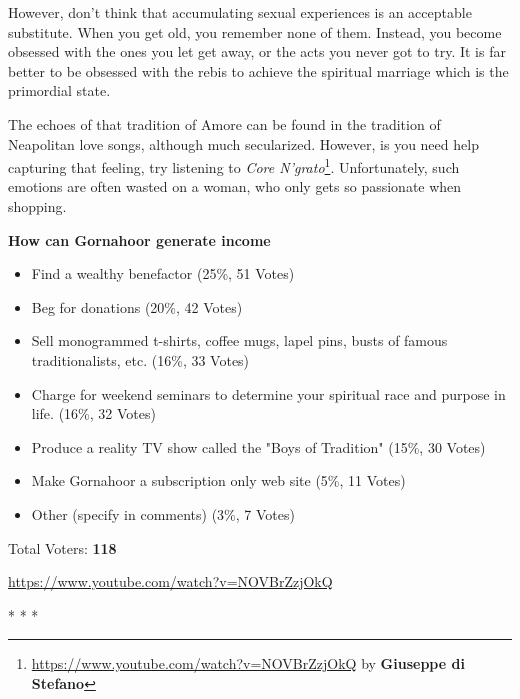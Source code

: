 However, don't think that accumulating sexual experiences is an acceptable substitute. When you get old, you remember none of them. Instead, you become obsessed with the ones you let get away, or the acts you never got to try. It is far better to be obsessed with the rebis to achieve the spiritual marriage which is the primordial state.

The echoes of that tradition of Amore can be found in the tradition of Neapolitan love songs, although much secularized. However, is you need help capturing that feeling, try listening to
\emph{Core N'grato}\footnote{\url{https://www.youtube.com/watch?v=NOVBrZzjOkQ} by \textbf{Giuseppe di Stefano}}. Unfortunately, such emotions are often wasted on a woman, who only gets so passionate when shopping.

\textbf{How can Gornahoor generate income}


\begin{itemize}


\item Find a wealthy benefactor {(25\%, 51 Votes)}

\item Beg for donations {(20\%, 42 Votes)}

\item Sell monogrammed t-shirts, coffee mugs, lapel pins, busts of famous traditionalists, etc. {(16\%, 33 Votes)}

\item Charge for weekend seminars to determine your spiritual race and purpose in life. {(16\%, 32 Votes)}

\item Produce a reality TV show called the "Boys of Tradition" (15\%, 30 Votes)

\item Make Gornahoor a subscription only web site {(5\%, 11 Votes)}

\item Other (specify in comments) {(3\%, 7 Votes)}
\end{itemize}


Total Voters: \textbf{118}

\url{https://www.youtube.com/watch?v=NOVBrZzjOkQ}


\begin{center}* * *\end{center}

